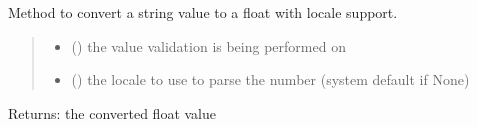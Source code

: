 \documentclass[letterpaper,10pt,english]{sphinxmanual}
\begin{document}
\begin{fulllineitems}
\begin{fulllineitems}
\label{\detokenize{apache_commons_validator_python:apache_commons_validator_python.generic_type_validator_new.GenericTypeValidator.format_float_locale}}
\pysigstartsignatures
{}
\pysigstopsignatures
\sphinxAtStartPar
Method to convert a string value to a float with locale support.
\begin{quote}\begin{description}
\begin{itemize}
\item {} 
\sphinxAtStartPar
{} () \textendash{} the value validation is being performed on

\item {} 
\sphinxAtStartPar
{} () \textendash{} the locale to use to parse the number (system default if None)

\end{itemize}

\end{description}\end{quote}

\sphinxAtStartPar
Returns: the converted float value

\end{fulllineitems}



\end{fulllineitems}
\end{document}
